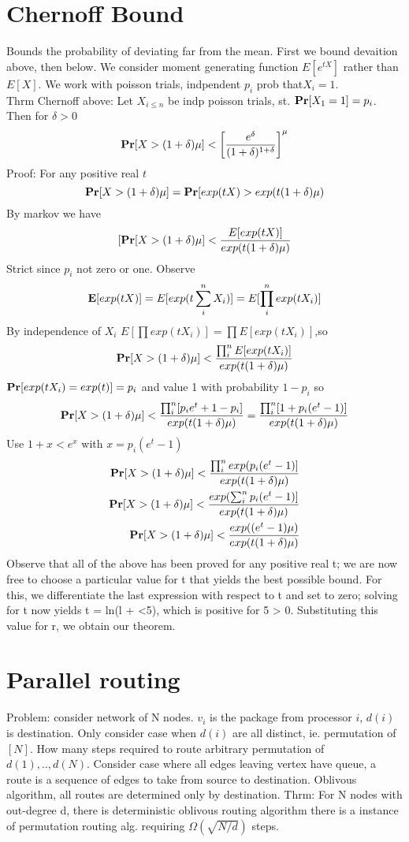 \documentclass[a4paper]{article}
\def\E{\mbox{\textbf{E}}}
\def\Pr{\mbox{\textbf{Pr}}}
\begin{document}
\section{Chernoff Bound}
Bounds the probability of deviating far from the mean. First we bound devaition above, then below. We consider moment generating function \(E[e^{tX}]\) rather than \(E[X]\). We work with poisson trials, indpendent \(p_i\) prob that\(X_i=1\).\\
Thrm Chernoff above: Let \(X_{i\leq n}\) be indp poisson trials, st. \(\Pr[X_1 = 1] = p_i\). Then for \(\delta > 0\) 
\[\Pr[X>(1+\delta)\mu] < \left[\frac{e^\delta}{(1+\delta)^{1+\delta}}\right]^\mu\]
Proof: For any positive real \(t\)
\[\Pr[X>(1+\delta)\mu]  = \Pr[exp(tX) > exp(t(1+\delta)\mu)\]
By markov we have
\[[\Pr[X>(1+\delta)\mu] < \frac{E[exp(tX)]}{exp(t(1+\delta)\mu)}\]
Strict since \(p_i\) not zero or one. Observe
\[\E[exp(tX)] = E[exp(t\sum_i^n X_i)] = E[\prod_i^n exp(tX_i)]\]
By independence of \(X_i\) \(E[\prod exp(tX_i)] = \prod E[exp(tX_i)]\),so
\[\Pr[X > (1+\delta)\mu] < \frac{\prod_i^n E[exp(tX_i)]}{exp(t(1+\delta)\mu)}\]
\(\Pr[exp(tX_i)=exp(t)] = p_i\) and value 1 with probability \(1-p_i\) so
\[\Pr[X>(1+\delta)\mu] < \frac{\prod_i^n[p_ie^t + 1 - p_i]}{exp(t(1+\delta)\mu)} = \frac{\prod_i^n [1+p_i(e^t-1)]}{exp(t(1+\delta)\mu)}\]
Use \(1+x < e^x\) with \(x = p_i(e^t-1)\) 
\begin{align}
\Pr[X > (1+\delta)\mu] < \frac{\prod_i^n exp(p_i(e^t -1)]}{exp(t(1+\delta)\mu)}\\
\Pr[X > (1+\delta)\mu] < \frac{ exp(\sum_i^n p_i(e^t -1)]}{exp(t(1+\delta)\mu)}\\
\Pr[X > (1+\delta)\mu] < \frac{ exp((e^t -1)\mu)}{exp(t(1+\delta)\mu)}
\end{align}
Observe that all of the above has been proved for any positive real t; we are
now free to choose a particular value for t that yields the best possible bound.
For this, we differentiate the last expression with respect to t and set to zero;
solving for t now yields t = ln(l + <5), which is positive for 5 > 0. Substituting
this value for r, we obtain our theorem.

\section{Parallel routing}
Problem: consider network of N nodes. \(v_i\) is the package from processor \(i\), \(d(i)\) is destination. Only consider case when \(d(i)\) are all distinct, ie. permutation of \([N]\). How many steps required to route arbitrary permutation of \(d(1),..,d(N)\).
Consider case where all edges leaving vertex have queue, a route is a sequence of edges to take from source to destination. Oblivous algorithm, all routes are determined only by destination. 
Thrm: For N nodes with out-degree d, there is deterministic oblivous routing algorithm there is a instance of permutation routing alg. requiring \(\Omega(\sqrt{N/d})\) steps.
\end{document}

